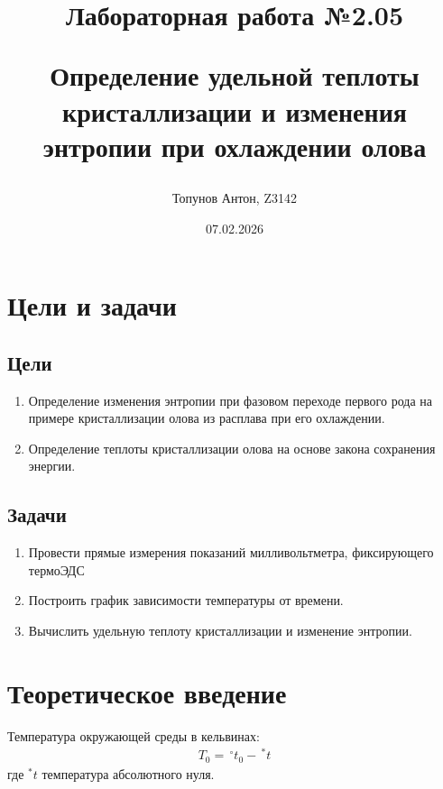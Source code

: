 \documentclass{article}
\title{Лабораторная работа №2.05

Определение удельной теплоты кристаллизации и изменения энтропии при охлаждении олова}
\author{Топунов Антон, Z3142}
\date{07.02.2026}
\begin{document}
\maketitle
\clearpage
\section{Цели и задачи}
\subsection{Цели}
\begin{enumerate}
    \item Определение изменения энтропии при фазовом переходе первого рода на примере кристаллизации олова из расплава при его охлаждении.
    \item Определение теплоты кристаллизации олова на основе закона сохранения энергии.
\end{enumerate}
\subsection{Задачи}
\begin{enumerate}
    \item Провести прямые измерения показаний милливольтметра, фиксирующего термоЭДС
    \item Построить график зависимости температуры от времени.
    \item Вычислить удельную теплоту кристаллизации и изменение энтропии.
\end{enumerate}
\section{Теоретическое введение}

Температура окружающей среды в кельвинах:
\begin{gather*}
    T_0 = \, ^\circ t_0 - \, ^*t
\end{gather*}
где $^*t$ температура абсолютного нуля.
\end{document}
